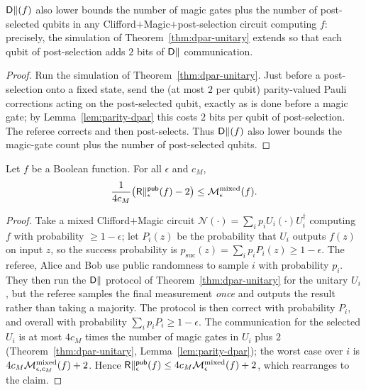 \begin{proposition}
  \label{prop:postselection}
  $\mathsf{D}\|(f)$ also lower bounds the number of magic gates plus the number of
  post-selected qubits in any Clifford$+$Magic$+$post-selection circuit computing
  $f$: precisely, the simulation of Theorem~\ref{thm:dpar-unitary} extends so
  that each qubit of post-selection adds $2$ bits of $\mathsf{D}\|$ communication.
\end{proposition}
\begin{proof}
  Run the simulation of Theorem~\ref{thm:dpar-unitary}. Just before a
  post-selection onto a fixed state, send the (at most $2$ per qubit) parity-valued
  Pauli corrections acting on the post-selected qubit, exactly as is done before a
  magic gate; by Lemma~\ref{lem:parity-dpar} this costs $2$ bits per qubit of
  post-selection. The referee corrects and then post-selects. Thus $\mathsf{D}\|(f)$ also
  lower bounds the magic-gate count plus the number of post-selected qubits.
\end{proof}

\begin{theorem}
  \label{thm:rpar-mixed}
  Let $f$ be a Boolean function. For all $\epsilon$ and $c_M$,
  \[
    \frac{1}{4 c_M}\big(\mathsf{R}\|^{\mathsf{pub}}_\epsilon(f) - 2\big) \le \mathcal{M}^{\mathrm{mixed}}_{\epsilon}(f).
  \]
\end{theorem}
\begin{proof}
  Take a mixed Clifford$+$Magic circuit $\mathcal{N}(\cdot)=\sum_i p_i U_i(\cdot)
  U_i^\dagger$ computing $f$ with probability $\ge 1-\epsilon$; let $P_i(z)$ be the
  probability that $U_i$ outputs $f(z)$ on input $z$, so the success probability
  is $p_{\mathrm{suc}}(z) = \sum_i p_i P_i(z) \ge 1-\epsilon$. The referee, Alice
  and Bob use public randomness to sample $i$ with probability $p_i$. They then
  run the $\mathsf{D}\|$ protocol of Theorem~\ref{thm:dpar-unitary} for the unitary
  $U_i$, but the referee samples the final measurement \emph{once} and outputs
  the result rather than taking a majority. The protocol is then correct with
  probability $P_i$, and overall with probability $\sum_i p_i P_i \ge 1-\epsilon$.
  The communication for the selected $U_i$ is at most $4c_M$ times the number of
  magic gates in $U_i$ plus $2$ (Theorem~\ref{thm:dpar-unitary},
  Lemma~\ref{lem:parity-dpar}); the worst case over $i$ is $4c_M
  \mathcal{M}^{\mathrm{mixed}}_{\epsilon,c_M}(f) + 2$. Hence $\mathsf{R}\|^{\mathsf{pub}}_\epsilon(f) \le
  4c_M\mathcal{M}^{\mathrm{mixed}}_{\epsilon}(f)+2$, which rearranges to the claim.
\end{proof}

